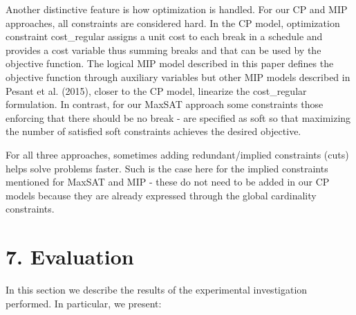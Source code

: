 \documentclass[10pt]{article}
\begin{document}
Another distinctive feature is how optimization is handled. For our CP and MIP approaches, all constraints are considered hard. In the CP model, optimization constraint cost\_regular assigns a unit cost to each break in a schedule and provides a cost variable thus summing breaks and that can be used by the objective function. The logical MIP model described in this paper defines the objective function through auxiliary variables but other MIP models described in Pesant et al. (2015), closer to the CP model, linearize the cost\_regular formulation. In contrast, for our MaxSAT approach some constraints those enforcing that there should be no break - are specified as soft so that maximizing the number of satisfied soft constraints achieves the desired objective.

For all three approaches, sometimes adding redundant/implied constraints (cuts) helps solve problems faster. Such is the case here for the implied constraints mentioned for MaxSAT and MIP - these do not need to be added in our CP models because they are already expressed through the global cardinality constraints.

\section*{7. Evaluation}
In this section we describe the results of the experimental investigation performed. In particular, we present:
\end{document}
